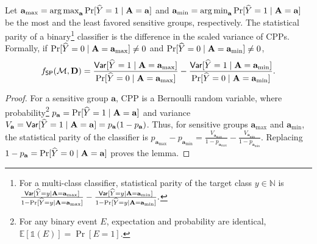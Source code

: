 \begin{lemma}
	\label{fairness_fairXplainer_lm:sp_var_relation}
	Let $ \mathbf{a}_{\max} = \operatorname*{arg\,max}_{\mathbf{a}} \Pr[\widehat{Y} = 1 \mid  \mathbf{A} = \mathbf{a}] $ and $ \mathbf{a}_{\min} = \operatorname*{arg\,min}_{\mathbf{a}} \Pr[\widehat{Y} = 1 \mid \mathbf{A} = \mathbf{a}] $ be the most and the least favored sensitive groups, respectively. The statistical parity of a binary\footnote{For a multi-class classifier, statistical parity of the target class $ y \in \mathbb{N} $ is $ \frac{\mathsf{Var}[\widehat{Y} = y \mid \mathbf{A} = \mathbf{a}_{\max}]}{1 - \Pr[\widehat{Y} = y \mid  \mathbf{A} = \mathbf{a}_{\max}]} - \frac{\mathsf{Var}[\widehat{Y} = y \mid \mathbf{A} = \mathbf{a}_{\min}] }{1 - \Pr[\widehat{Y} = y \mid  \mathbf{A} = \mathbf{a}_{\min}]}. $} classifier is the difference in the scaled variance of CPPs. Formally, if $\Pr[\widehat{Y} = 0 \mid  \mathbf{A} = \mathbf{a}_{\max}] \neq 0$ and $\Pr[\widehat{Y} = 0 \mid  \mathbf{A} = \mathbf{a}_{\min}] \neq 0$,
	\[
	 f_{\mathsf{SP}}(\mathcal{M}, \mathbf{D}) = \frac{\mathsf{Var}[\widehat{Y} = 1\mid\mathbf{A} = \mathbf{a}_{\max}]}{\Pr[\widehat{Y} = 0 \mid  \mathbf{A} = \mathbf{a}_{\max}]} - \frac{\mathsf{Var}[\widehat{Y} = 1\mid\mathbf{A} = \mathbf{a}_{\min}] }{\Pr[\widehat{Y} = 0 \mid  \mathbf{A} = \mathbf{a}_{\min}]}.
	\]
\end{lemma}
\begin{proof}
	For a sensitive group $ \mathbf{a} $, CPP  is a Bernoulli random variable, where probability\footnote{For any binary event $ E $, expectation and probability are identical, $ \mathbb{E}[\mathds{1}(E)] = \Pr[E = 1] $.} $ p_{\mathbf{a}}  = \Pr[\widehat{Y} = 1 \mid \mathbf{A} = \mathbf{a}] $ and variance $ V_{\mathbf{a}} = \mathsf{Var}[\widehat{Y} = 1 \mid \mathbf{A} = \mathbf{a}] = p_{\mathbf{a}} (1 - p_{\mathbf{a}}) $. Thus, for sensitive groups $ \mathbf{a}_{\max} $ and $ \mathbf{a}_{\min} $, the statistical parity of the classifier is $ p_{\mathbf{a}_{\max}}  - p_{\mathbf{a}_{\min}} =  \frac{V_{\mathbf{a}_{\max}}}{1 - p_{\mathbf{a}_{\max}}}  - \frac{V_{\mathbf{a}_{\min}}}{1 - p_{\mathbf{a}_{\min}}} $. Replacing $ 1 - p_\mathbf{a} = \Pr[\widehat{Y} = 0 \mid \mathbf{A} = \mathbf{a}] $  proves the lemma.
\end{proof}


